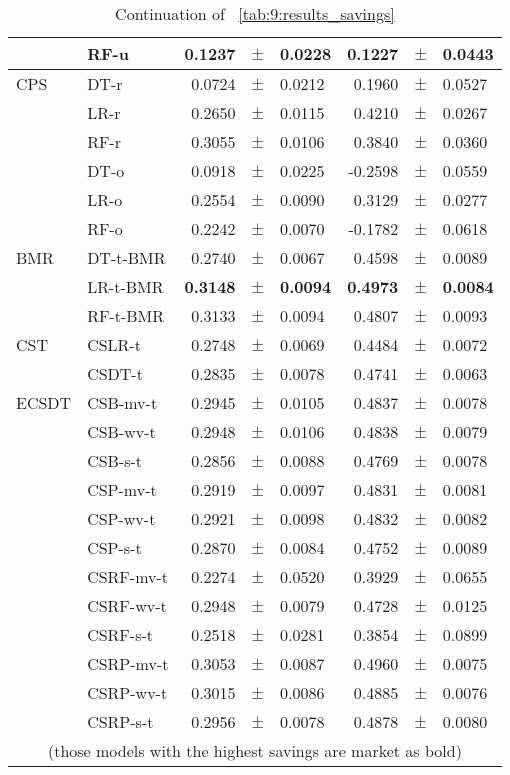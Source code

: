 {\begin{table}[!t]
\begin{tabular}{l l r@{\hskip 0in}c@{\hskip 0in}l r@{\hskip 0in}c@{\hskip 0in}l  }
&RF-u & 0.1237 &$\pm$& 0.0228 & 0.1227 &$\pm$& 0.0443\\ 
\hline 
CPS&DT-r & 0.0724 &$\pm$&0.0212 & 0.1960 &$\pm$& 0.0527\\ 
&LR-r &  0.2650 &$\pm$& 0.0115 & 0.4210 &$\pm$& 0.0267\\ 
&RF-r & 0.3055 &$\pm$& 0.0106 & 0.3840 &$\pm$& 0.0360\\ 
&DT-o &  0.0918 &$\pm$&0.0225 & -0.2598 &$\pm$& 0.0559\\ 
&LR-o &  0.2554 &$\pm$&0.0090 & 0.3129 &$\pm$& 0.0277\\ 
&RF-o &  0.2242 &$\pm$&0.0070 & -0.1782 &$\pm$& 0.0618\\ 
\hline 
BMR&DT-t-BMR & 0.2740 &$\pm$& 0.0067 & 0.4598 &$\pm$& 0.0089\\ 
&LR-t-BMR & \bf{0.3148} &\bf{$\pm$}& \bf{0.0094} & \bf{0.4973} &\bf{$\pm$}& \bf{0.0084}\\ 
&RF-t-BMR & 0.3133 &$\pm$& 0.0094 & 0.4807 &$\pm$& 0.0093\\ 
\hline 
CST&CSLR-t & 0.2748 &$\pm$&0.0069 & 0.4484 &$\pm$& 0.0072\\ 
&CSDT-t &  0.2835 &$\pm$& 0.0078 & 0.4741 &$\pm$& 0.0063\\ 
\hline 
ECSDT&CSB-mv-t &  0.2945 &$\pm$& 0.0105 & 0.4837 &$\pm$& 0.0078\\ 
&CSB-wv-t & 0.2948 &$\pm$&0.0106 & 0.4838 &$\pm$& 0.0079\\ 
&CSB-s-t &  0.2856 &$\pm$& 0.0088 & 0.4769 &$\pm$& 0.0078\\ 
&CSP-mv-t & 0.2919 &$\pm$& 0.0097 & 0.4831 &$\pm$& 0.0081\\ 
&CSP-wv-t & 0.2921 &$\pm$& 0.0098 & 0.4832 &$\pm$& 0.0082\\ 
&CSP-s-t &  0.2870 &$\pm$& 0.0084 & 0.4752 &$\pm$& 0.0089\\ 
&CSRF-mv-t &  0.2274 &$\pm$& 0.0520 & 0.3929 &$\pm$& 0.0655\\ 
&CSRF-wv-t &  0.2948 &$\pm$& 0.0079 & 0.4728 &$\pm$& 0.0125\\ 
&CSRF-s-t &  0.2518 &$\pm$& 0.0281 & 0.3854 &$\pm$& 0.0899\\ 
&CSRP-mv-t & 0.3053 &$\pm$& 0.0087 & 0.4960 &$\pm$& 0.0075\\ 
&CSRP-wv-t & 0.3015 &$\pm$& 0.0086 & 0.4885 &$\pm$& 0.0076\\ 
&CSRP-s-t & 0.2956 &$\pm$& 0.0078 & 0.4878 &$\pm$& 0.0080\\ 
  \hline
  \multicolumn{8}{c}{(those models with the highest savings are market as bold)}
  \end{tabular}
    \caption{Continuation of \tablename{~\ref{tab:9:results_savings}}}
    \label{tab:9:results_savings2}
  \end{table}
  
}
